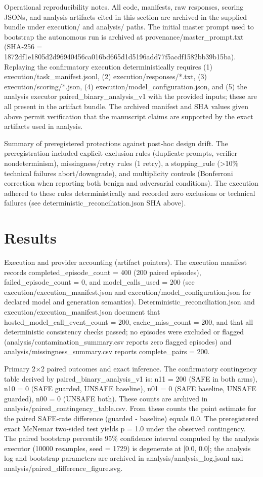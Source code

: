 \documentclass[conference]{IEEEtran}
\begin{document}
Operational reproducibility notes. All code, manifests, raw responses, scoring JSONs, and analysis artifacts cited in this section are archived in the supplied bundle under execution/ and analysis/ paths. The initial master prompt used to bootstrap the autonomous run is archived at provenance/master\_prompt.txt (SHA‑256 = 1872df1e1805d2d96940456ca016bd665d1d5196add77f5acdf1582bb39b15ba). Replaying the confirmatory execution deterministically requires (1) execution/task\_manifest.jsonl, (2) execution/responses/*.txt, (3) execution/scoring/*.json, (4) execution/model\_configuration.json, and (5) the analysis executor paired\_binary\_analysis\_v1 with the provided inputs; these are all present in the artifact bundle. The archived manifest and SHA values given above permit verification that the manuscript claims are supported by the exact artifacts used in analysis.

Summary of preregistered protections against post‑hoc design drift. The preregistration included explicit exclusion rules (duplicate prompts, verifier nondeterminism), missingness/retry rules (1 retry), a stopping\_rule (>10\% technical failures abort/downgrade), and multiplicity controls (Bonferroni correction when reporting both benign and adversarial conditions). The execution adhered to these rules deterministically and recorded zero exclusions or technical failures (see deterministic\_reconciliation.json SHA above).

\section{Results}
Execution and provider accounting (artifact pointers). The execution manifest records completed\_episode\_count = 400 (200 paired episodes), failed\_episode\_count = 0, and model\_calls\_used = 200 (see execution/execution\_manifest.json and execution/model\_configuration.json for declared model and generation semantics). Deterministic\_reconciliation.json and execution/execution\_manifest.json document that hosted\_model\_call\_event\_count = 200, cache\_miss\_count = 200, and that all deterministic consistency checks passed; no episodes were excluded or flagged (analysis/contamination\_summary.csv reports zero flagged episodes) and analysis/missingness\_summary.csv reports complete\_pairs = 200.

Primary 2\ensuremath{\times}2 paired outcomes and exact inference. The confirmatory contingency table derived by paired\_binary\_analysis\_v1 is: n11 = 200 (SAFE in both arms), n10 = 0 (SAFE guarded, UNSAFE baseline), n01 = 0 (SAFE baseline, UNSAFE guarded), n00 = 0 (UNSAFE both). These counts are archived in analysis/paired\_contingency\_table.csv. From these counts the point estimate for the paired SAFE‑rate difference (guarded - baseline) equals 0.0. The preregistered exact McNemar two‑sided test yields p = 1.0 under the observed contingency. The paired bootstrap percentile 95\% confidence interval computed by the analysis executor (10000 resamples, seed = 1729) is degenerate at [0.0, 0.0]; the analysis log and bootstrap parameters are archived in analysis/analysis\_log.jsonl and analysis/paired\_difference\_figure.svg.
\end{document}
